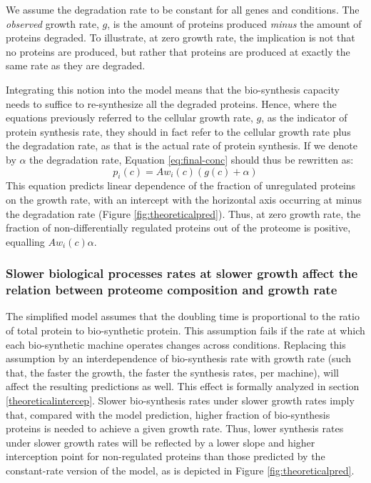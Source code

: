 \documentclass{article}
\begin{document}
We assume the degradation rate to be constant for all genes and conditions.
The \emph{observed} growth rate, $g$, is the amount of proteins produced \emph{minus} the amount of proteins degraded.
To illustrate, at zero growth rate, the implication is not that no proteins are produced, but rather that proteins are produced at exactly the same rate as they are degraded.

Integrating this notion into the model means that the bio-synthesis capacity needs to suffice to re-synthesize all the degraded proteins.
Hence, where the equations previously referred to the cellular growth rate, $g$, as the indicator of protein synthesis rate, they should in fact refer to the cellular growth rate plus the degradation rate, as that is the actual rate of protein synthesis.
If we denote by $\alpha$ the degradation rate, Equation \ref{eq:final-conc} should thus be rewritten as:
\begin{equation}
  \label{eq:final-conc-deg}
  p_i(c)=Aw_i(c)(g(c)+\alpha)
\end{equation}
This equation predicts linear dependence of the fraction of unregulated proteins on the growth rate, with an intercept with the horizontal axis occurring at minus the degradation rate (Figure \ref{fig:theoreticalpred}).
Thus, at zero growth rate, the fraction of non-differentially regulated proteins out of the proteome is positive, equalling $Aw_i(c)\alpha$.

\subsubsection{Slower biological processes rates at slower growth affect the relation between proteome composition and growth rate}
\label{slowbiosynthesis}
The simplified model assumes that the doubling time is proportional to the ratio of total protein to bio-synthetic protein.
This assumption fails if the rate at which each bio-synthetic machine operates changes across conditions.
Replacing this assumption by an interdependence of bio-synthesis rate with growth rate (such that, the faster the growth, the faster the synthesis rates, per machine)\cite{Bremer1987,Valgepea2013}, will affect the resulting predictions as well.
This effect is formally analyzed in section \ref{theoreticalintercep}.
Slower bio-synthesis rates under slower growth rates imply that, compared with the model prediction, higher fraction of bio-synthesis proteins is needed to achieve a given growth rate.
Thus, lower synthesis rates under slower growth rates will be reflected by a lower slope and higher interception point for non-regulated proteins than those predicted by the constant-rate version of the model, as is depicted in Figure \ref{fig:theoreticalpred}.
\end{document}
